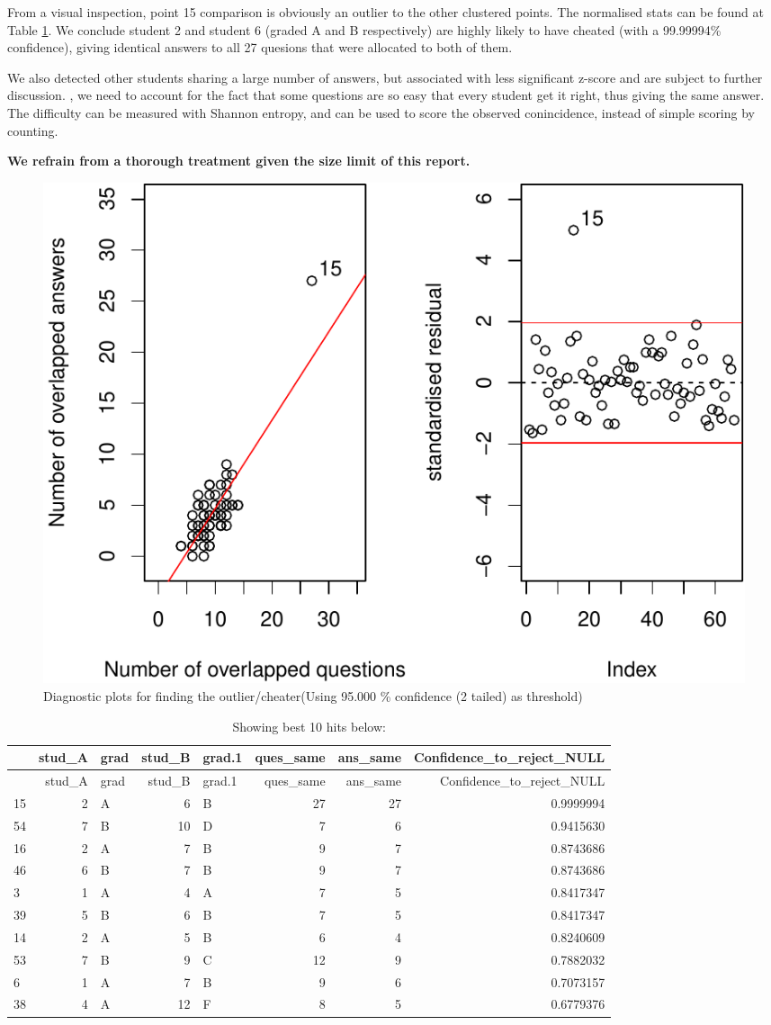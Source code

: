 \documentclass[a4paperpaper,]{article}
\begin{document}
From a visual inspection, point 15 comparison is obviously an outlier to
the other clustered points. The normalised stats can be found at Table
\ref{tab:exam_diag}. We conclude student 2 and student 6 (graded A and B
respectively) are highly likely to have cheated (with a 99.99994\%
confidence), giving identical answers to all 27 quesions that were
allocated to both of them.

We also detected other students sharing a large number of answers, but
associated with less significant z-score and are subject to further
discussion. , we need to account for the fact that some questions are so
easy that every student get it right, thus giving the same answer. The
difficulty can be measured with Shannon entropy, and can be used to
score the observed conincidence, instead of simple scoring by counting.

\textbf{We refrain from a thorough treatment given the size limit of
this report.}

\begin{figure}
\centering
\includegraphics{index_files/figure-latex/exam_diag-1.pdf}
\caption{\label{fig:exam_diag} Diagnostic plots for finding the
outlier/cheater\newline (Using 95.000 \% confidence (2 tailed) as
threshold)}
\end{figure}

\begin{longtable}[]{@{}lrlrlrrr@{}}
\caption{\label{tab:exam_diag}Showing best 10 hits
below:}\tabularnewline
\toprule
& stud\_A & grad & stud\_B & grad.1 & ques\_same & ans\_same &
Confidence\_to\_reject\_NULL\tabularnewline
\midrule
\endfirsthead
\toprule
& stud\_A & grad & stud\_B & grad.1 & ques\_same & ans\_same &
Confidence\_to\_reject\_NULL\tabularnewline
\midrule
\endhead
15 & 2 & A & 6 & B & 27 & 27 & 0.9999994\tabularnewline
54 & 7 & B & 10 & D & 7 & 6 & 0.9415630\tabularnewline
16 & 2 & A & 7 & B & 9 & 7 & 0.8743686\tabularnewline
46 & 6 & B & 7 & B & 9 & 7 & 0.8743686\tabularnewline
3 & 1 & A & 4 & A & 7 & 5 & 0.8417347\tabularnewline
39 & 5 & B & 6 & B & 7 & 5 & 0.8417347\tabularnewline
14 & 2 & A & 5 & B & 6 & 4 & 0.8240609\tabularnewline
53 & 7 & B & 9 & C & 12 & 9 & 0.7882032\tabularnewline
6 & 1 & A & 7 & B & 9 & 6 & 0.7073157\tabularnewline
38 & 4 & A & 12 & F & 8 & 5 & 0.6779376\tabularnewline
\bottomrule
\end{longtable}
\end{document}
